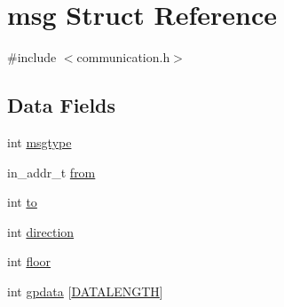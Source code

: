 \hypertarget{structmsg}{\section{msg Struct Reference}
\label{structmsg}
}


{\ttfamily \#include $<$communication.\-h$>$}

\subsection*{Data Fields}
\begin{DoxyCompactItemize}
\item 
int \hyperlink{structmsg_ad976f3a497337466495d05d9d0adaae6}{msgtype}
\item 
in\-\_\-addr\-\_\-t \hyperlink{structmsg_a57b66f80e7f8c73e669ea67813cd3e95}{from}
\item 
int \hyperlink{structmsg_ac0ed249f3db34b8135fd2717bda56844}{to}
\item 
int \hyperlink{structmsg_a886d551d5381dc3e53f17825ffc51641}{direction}
\item 
int \hyperlink{structmsg_aae85c3a510bb6ec64e3569ede2518893}{floor}
\item 
int \hyperlink{structmsg_af06efcb2e3d6af562c283ed986ba246f}{gpdata} \mbox{[}\hyperlink{communication_8h_aa0ab1d7cdee0ee968fd32174c6b3bad2}{D\-A\-T\-A\-L\-E\-N\-G\-T\-H}\mbox{]}
\end{DoxyCompactItemize}


